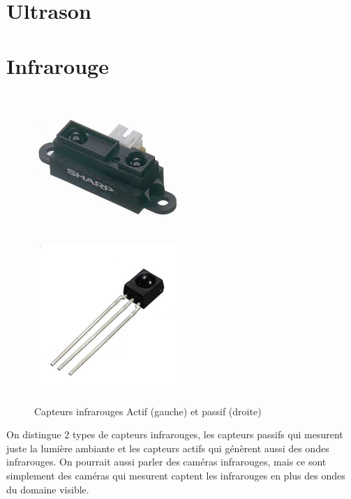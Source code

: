 \documentclass[a4paper, 11pt]{report}
\begin{document}
\section{Ultrason}

\section{Infrarouge}

\begin{figure}[h!]
\begin{centering}
\includegraphics[width=0.5\textwidth]{images/capteurInfrarougeActif.jpg}
\includegraphics[width=0.5\textwidth]{images/capteurInfrarougePassif.jpg}
\caption{Capteurs infrarouges Actif (gauche) et passif (droite)}
\par\end{centering}
\end{figure}

On distingue 2 types de capteurs infrarouges, les capteurs passifs qui mesurent juste la lumière ambiante et les capteurs actifs qui génèrent aussi des ondes infrarouges. On pourrait aussi parler des caméras infrarouges, mais ce sont simplement des caméras qui mesurent captent les infrarouges en plus des ondes du domaine visible.
\end{document}
